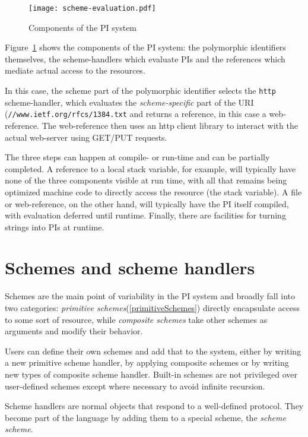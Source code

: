 \documentclass[preprint,authoryear]{acm_proc_article-sp}
\begin{document}
\begin{figure}[htbp]
\caption{Components of the PI system}
\label{scheme-eval}
\begin{center}
\texttt{[image: scheme-evaluation.pdf]}
\end{center}
\end{figure}

Figure~\ref{scheme-eval} shows the components of the PI system:  the polymorphic
identifiers themselves, the scheme-handlers which evaluate PIs and the references
which mediate actual access to the resources.

In this case, the scheme part of the
polymorphic identifier selects the {\tt http} scheme-handler, which evaluates the {\em scheme-specific}
part of the URI ({\tt //www.ietf.org/rfcs/1384.txt} and returns a reference, in this case a 
web-reference.   The web-reference then uses an http client library to interact with the
actual web-server using GET/PUT requests.

The three steps can happen at compile- or run-time and can be partially completed.
A reference to a local stack variable, for example, will typically have none of the
three components visible at run time, with all that remains being optimized 
machine code to directly access the resource (the stack variable).
A file or web-reference, on the other hand, will typically have the PI itself
compiled, with evaluation deferred until runtime.  Finally, there are facilities
for turning strings into PIs at runtime.


\section{Schemes and scheme handlers}

Schemes are the main point of variability in the PI system
and broadly fall into two categories:   {\em primitive schemes}(\ref{primitiveSchemes})
directly encapsulate access to some sort of resource, while {\em composite schemes} 
take other schemes as arguments and modify their behavior.

Users can define their own schemes and add that 
to the system, either by writing
a new primitive scheme handler, by applying composite schemes or by writing new types
of composite scheme handler.  Built-in schemes are not privileged over user-defined
schemes except where necessary to avoid infinite recursion.

Scheme handlers are normal objects that respond to a well-defined protocol.  They
become part of the language by adding them to a special scheme, the {\em scheme scheme}.
\end{document}
